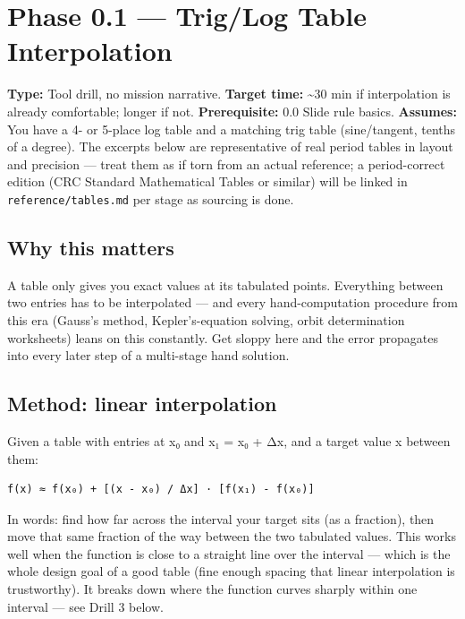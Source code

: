 \documentclass[
  10pt,
]{article}
\author{}
\date{}
\begin{document}
\hypertarget{phase-0.1-triglog-table-interpolation}{%
\section{Phase 0.1 --- Trig/Log Table
Interpolation}\label{phase-0.1-triglog-table-interpolation}}

\textbf{Type:} Tool drill, no mission narrative. \textbf{Target time:}
\textasciitilde30 min if interpolation is already comfortable; longer if
not. \textbf{Prerequisite:} 0.0 Slide rule basics. \textbf{Assumes:} You
have a 4- or 5-place log table and a matching trig table (sine/tangent,
tenths of a degree). The excerpts below are representative of real
period tables in layout and precision --- treat them as if torn from an
actual reference; a period-correct edition (CRC Standard Mathematical
Tables or similar) will be linked in \texttt{reference/tables.md} per
stage as sourcing is done.

\hypertarget{why-this-matters}{%
\subsection{Why this matters}\label{why-this-matters}}

A table only gives you exact values at its tabulated points. Everything
between two entries has to be interpolated --- and every
hand-computation procedure from this era (Gauss's method,
Kepler's-equation solving, orbit determination worksheets) leans on this
constantly. Get sloppy here and the error propagates into every later
step of a multi-stage hand solution.

\hypertarget{method-linear-interpolation}{%
\subsection{Method: linear
interpolation}\label{method-linear-interpolation}}

Given a table with entries at x₀ and x₁ = x₀ + Δx, and a target value x
between them:

\begin{verbatim}
f(x) ≈ f(x₀) + [(x - x₀) / Δx] · [f(x₁) - f(x₀)]
\end{verbatim}

In words: find how far across the interval your target sits (as a
fraction), then move that same fraction of the way between the two
tabulated values. This works well when the function is close to a
straight line over the interval --- which is the whole design goal of a
good table (fine enough spacing that linear interpolation is
trustworthy). It breaks down where the function curves sharply within
one interval --- see Drill 3 below.
\end{document}
